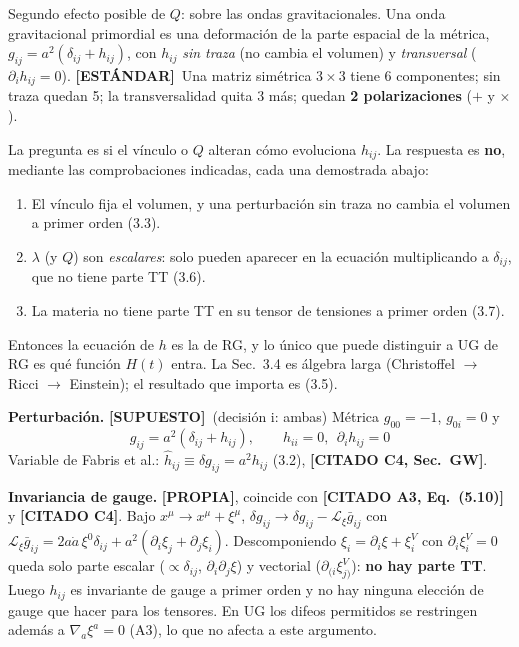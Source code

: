\documentclass[11pt,a4paper]{article}
\newcommand{\propia}{{\bfseries\color{TealBlue}[PROPIA]}}
\newcommand{\estandar}{{\bfseries\color{BurntOrange}[ESTÁNDAR]}}
\newcommand{\supuesto}{{\bfseries\color{Plum}[SUPUESTO]}}
\newcommand{\citado}[1]{{\bfseries\color{RoyalBlue}[CITADO #1]}}
\newcommand{\sub}[2]{\par\medskip\noindent{\bfseries\color{NavyBlue}#1}\quad\textbf{#2}}
\begin{document}
\begin{enpalabras}
Segundo efecto posible de $Q$: sobre las ondas gravitacionales. Una onda gravitacional primordial es una deformación de la parte espacial de la métrica, $g_{ij}=a^2(\delta_{ij}+h_{ij})$, con $h_{ij}$ \emph{sin traza} (no cambia el volumen) y \emph{transversal} ($\partial_ih_{ij}=0$). \estandar\ Una matriz simétrica $3\times3$ tiene 6 componentes; sin traza quedan 5; la transversalidad quita 3 más; quedan \textbf{2 polarizaciones} ($+$ y $\times$).

La pregunta es si el vínculo o $Q$ alteran cómo evoluciona $h_{ij}$. La respuesta es \textbf{no}, mediante las comprobaciones indicadas, cada una demostrada abajo:
\begin{enumerate}[nosep]
\item El vínculo fija el volumen, y una perturbación sin traza no cambia el volumen a primer orden (3.3).
\item $\lambda$ (y $Q$) son \emph{escalares}: solo pueden aparecer en la ecuación multiplicando a $\delta_{ij}$, que no tiene parte TT (3.6).
\item La materia no tiene parte TT en su tensor de tensiones a primer orden (3.7).
\end{enumerate}
Entonces la ecuación de $h$ es la de RG, y lo único que puede distinguir a UG de RG es qué función $H(t)$ entra. La Sec.~3.4 es álgebra larga (Christoffel $\to$ Ricci $\to$ Einstein); el resultado que importa es (3.5).
\end{enpalabras}

\sub{3.1}{Perturbación.} \supuesto\ (decisión i: ambas) Métrica $g_{00}=-1$, $g_{0i}=0$ y
\begin{equation}
g_{ij}=a^2(\delta_{ij}+h_{ij}),\qquad h_{ii}=0,\ \ \partial_ih_{ij}=0\tag{3.1}
\end{equation}
Variable de Fabris et al.: $\hat h_{ij}\equiv\delta g_{ij}=a^2h_{ij}$ (3.2), \citado{C4, Sec.~GW}.

\sub{3.2}{Invariancia de gauge.} \propia, coincide con \citado{A3, Eq.~(5.10)} y \citado{C4}. Bajo $x^\mu\to x^\mu+\xi^\mu$, $\delta g_{ij}\to\delta g_{ij}-\mathcal L_\xi\bar g_{ij}$ con $\mathcal L_\xi\bar g_{ij}=2a\dot a\,\xi^0\delta_{ij}+a^2(\partial_i\xi_j+\partial_j\xi_i)$. Descomponiendo $\xi_i=\partial_i\xi+\xi^V_i$ con $\partial_i\xi^V_i=0$ queda solo parte escalar ($\propto\delta_{ij}$, $\partial_i\partial_j\xi$) y vectorial ($\partial_{(i}\xi^V_{j)}$): \textbf{no hay parte TT}. Luego $h_{ij}$ es invariante de gauge a primer orden y no hay ninguna elección de gauge que hacer para los tensores. En UG los difeos permitidos se restringen además a $\nabla_a\xi^a=0$ (A3), lo que no afecta a este argumento.
\end{document}
